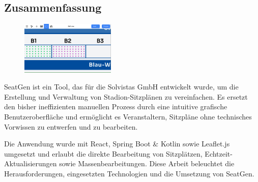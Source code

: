 \begin{spacing}{1}
  \chapter*{Zusammenfassung}
\end{spacing}
\begin{figure}
    \begin{center}
      \includegraphics[width=0.4\textwidth]{pics/abstract.png}
    \end{center}
\end{figure}
SeatGen ist ein Tool, das für die Solvistas GmbH entwickelt wurde, um die Erstellung und Verwaltung von Stadion-Sitzplänen zu vereinfachen. Es ersetzt den bisher ineffizienten manuellen Prozess durch eine intuitive grafische Benutzeroberfläche und ermöglicht es Veranstaltern, Sitzpläne ohne technisches Vorwissen zu entwerfen und zu bearbeiten.

Die Anwendung wurde mit React, Spring Boot \& Kotlin sowie Leaflet.js umgesetzt und erlaubt die direkte Bearbeitung von Sitzplätzen, Echtzeit-Aktualisierungen sowie Massenbearbeitungen. Diese Arbeit beleuchtet die Herausforderungen, eingesetzten Technologien und die Umsetzung von SeatGen.
\newpage
